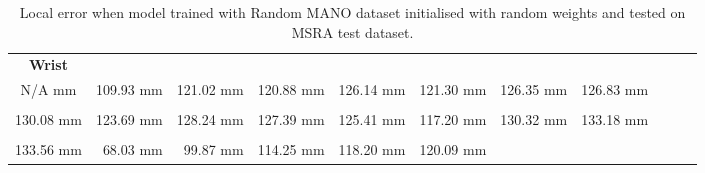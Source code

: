     \begin{table}[!ht]
    \begin{tabular}{|c|c|c|c|c|c|c|c|c|c|c|}
    \hline
    {\bfseries Wrist} & \cellcolor[HTML]{ff0000}{\bfseries IMCP} & \cellcolor[HTML]{ff0000}{\bfseries IPIP} & \cellcolor[HTML]{ff0000}{\bfseries IDIP} & \cellcolor[HTML]{ff0000}{\bfseries ITIP} & \cellcolor[HTML]{ff0000}{\bfseries MMCP} & \cellcolor[HTML]{ff0000}{\bfseries MPIP} & \cellcolor[HTML]{ff0000}{\bfseries MDIP}  \\
    N/A mm & \cellcolor[HTML]{ff0000}109.93 mm & \cellcolor[HTML]{ff0000}121.02 mm & \cellcolor[HTML]{ff0000}120.88 mm & \cellcolor[HTML]{ff0000}126.14 mm & \cellcolor[HTML]{ff0000}121.30 mm & \cellcolor[HTML]{ff0000}126.35 mm & \cellcolor[HTML]{ff0000}126.83 mm\\
    \hline
    \cellcolor[HTML]{ff0000}{\bfseries MTIP} & \cellcolor[HTML]{ff0000}{\bfseries RMCP} & \cellcolor[HTML]{ff0000}{\bfseries RPIP} & \cellcolor[HTML]{ff0000}{\bfseries RDIP} & \cellcolor[HTML]{ff0000}{\bfseries RTIP} & \cellcolor[HTML]{ff0000}{\bfseries PMCP} & \cellcolor[HTML]{ff0000}{\bfseries PPIP} & \cellcolor[HTML]{ff0000}{\bfseries PDIP}  \\
    \cellcolor[HTML]{ff0000}130.08 mm & \cellcolor[HTML]{ff0000}123.69 mm & \cellcolor[HTML]{ff0000}128.24 mm & \cellcolor[HTML]{ff0000}127.39 mm & \cellcolor[HTML]{ff0000}125.41 mm & \cellcolor[HTML]{ff0000}117.20 mm & \cellcolor[HTML]{ff0000}130.32 mm & \cellcolor[HTML]{ff0000}133.18 mm\\
    \hline
    \cellcolor[HTML]{ff0000}{\bfseries PTIP} & \cellcolor[HTML]{ff8000}{\bfseries TMCP} & \cellcolor[HTML]{ff0000}{\bfseries TPIP} & \cellcolor[HTML]{ff0000}{\bfseries PDIP} & \cellcolor[HTML]{ff0000}{\bfseries TTIP} & \cellcolor[HTML]{ff0000}{\bfseries Average}  \\
    \cellcolor[HTML]{ff0000}133.56 mm & \cellcolor[HTML]{ff8000}$\,\,\,$68.03 mm & \cellcolor[HTML]{ff0000}$\,\,\,$99.87 mm & \cellcolor[HTML]{ff0000}114.25 mm & \cellcolor[HTML]{ff0000}118.20 mm & \cellcolor[HTML]{ff0000}120.09 mm \\
    \cline{1-6}
    \end{tabular}
    \caption{Local error when model trained with Random MANO dataset initialised with random weights and tested on MSRA test dataset.}
    \label{tb:oral}
    \end{table}